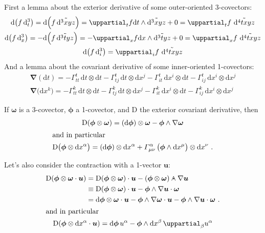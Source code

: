 \documentclass[\ifafour a4paper,12pt,\else a5paper,10pt,\fi%
onecolumn,oneside,article,%
british%
]{memoir}
\theoremstyle{remark}
\theoremstyle{innote}
\newcommand*{\de}{\uppartial}%
\newcommand*{\di}{\mathrm{d}}%
\newcommand*{\Di}{\mathrm{D}}%
\newcommand*{\nab}{\bm{\nabla}}%
\renewcommand*{\|}[1][]{\nonscript\:#1\vert\nonscript\:\mathopen{}}
\newcommand*{\dand}{\mathbin{\mathclap{\mkern12.5mu\bm{\cdot}}\wedge}}
\newcommand*{\se}[1]{\de_{#1}}
\newcommand*{\si}[1]{\di{#1}}
\newcommand*{\sssi}[1]{\di^{3}{#1}}
\newcommand*{\ssssi}[1]{\di^{4}{#1}}
\newcommand*{\tw}[1]{\tilde{#1}}
\newcommand*{\ttti}[1]{\di^{3}_{#1}}
\newcommand*{\yu}{\bm{u}}
\newcommand*{\yo}{\bm{\omega}}
\newcommand*{\yphi}{\bm{\phi}}
\begin{document}
First a lemma about the exterior derivative of some outer-oriented 3-covectors:
\begin{equation}
  \label{eq:d_3cov}
  \begin{gathered}
    \di\bigl(f\,\ttti{t}\bigr) =
    \di\Bigl( f\,\tw{\sssi{xyz}}\Bigr) =
    \se{t}f \di t \land \tw{\sssi{xyz}} + 0
    = \se{t}f\ \tw{\ssssi{txyz}}
    \\
    \di\bigl(f\,\ttti{x}\bigr) =
    -\di\Bigl( f\,\tw{\sssi{tyz}}\Bigr) =
    -\se{x}f \di x \land \tw{\sssi{tyz}} + 0
    = \se{x}f\ \tw{\ssssi{txyz}}
    \\
    \di\bigl(f\,\ttti{i}\bigr) =
    \se{i}f\ \tw{\ssssi{txyz}}
  \end{gathered}
\end{equation}
And a lemma about the covariant derivative of some inner-oriented 1-covectors:
\begin{equation}
  \label{eq:nab_1cov}
  \begin{gathered}
    \nab(\si{t}) =
    -\varGamma^{t}_{tt}\, \si{t} \otimes \si{t}
    -\varGamma^{t}_{tj}\, \si{t} \otimes \si{x^{j}}
    -\varGamma^{t}_{it}\, \si{x^{i}} \otimes \si{t}
    -\varGamma^{t}_{ij}\, \si{x^{i}} \otimes \si{x^{j}}
    \\
    \nab\bigl(\si{x^{k}}\bigr) =
    -\varGamma^{k}_{tt}\, \si{t} \otimes \si{t}
    -\varGamma^{k}_{tj}\, \si{t} \otimes \si{x^{j}}
    -\varGamma^{k}_{it}\, \si{x^{i}} \otimes \si{t}
    -\varGamma^{k}_{ij}\, \si{x^{i}} \otimes \si{x^{j}}
  \end{gathered}
\end{equation}

If $\yo$ is a 3-covector, $\yphi$ a 1-covector, and $\Di$ the exterior covariant derivative, then
\begin{gather}
  \label{eq:ext_cov_der_31}
  \Di(\yphi \otimes \yo) = (\di\yphi)\otimes\yo - \yphi\land\nabla\yo
  \\
  \shortintertext{and in particular}
  \label{eq:ext_cov_der_3basis}
  \Di\bigl(\yphi \otimes \di x^{\alpha}\bigr) =
  (\di\yphi)\otimes\di x^{\alpha} +
  \varGamma^{\alpha}_{\mu\nu}\,\bigl(\yphi\land\di x^{\mu}\bigr) \otimes \di x^{\nu}
  \ .
\end{gather}

Let's also consider the contraction with a 1-vector $\yu$:
\begin{gather}
  \label{eq:ext_cov_contracted_vector}
  \begin{split}
    \Di(\yphi \otimes \yo \cdot \yu) &=
    \Di(\yphi \otimes \yo) \cdot \yu
    -(\yphi \otimes \yo) \dand \nabla\yu
\\
    &\equiv
    \Di(\yphi \otimes \yo) \cdot \yu
    -\yphi \land \nabla\yu \cdot \yo
    \\
    &= \di\yphi \otimes \yo \cdot \yu
    -\yphi \land \nabla\yo \cdot \yu
    -\yphi \land \nabla\yu \cdot \yo
    \ .
  \end{split}
  \\
  \shortintertext{and in particular}
    \label{eq:ext_cov_basis_contracted_vector}
    \Di(\yphi \otimes \di x^{\alpha} \cdot \yu) =
    \di\yphi\, u^{\alpha}- \yphi \land \di x^{\beta}\, \de_{\beta} u^{\alpha}
\end{gather}
\end{document}
